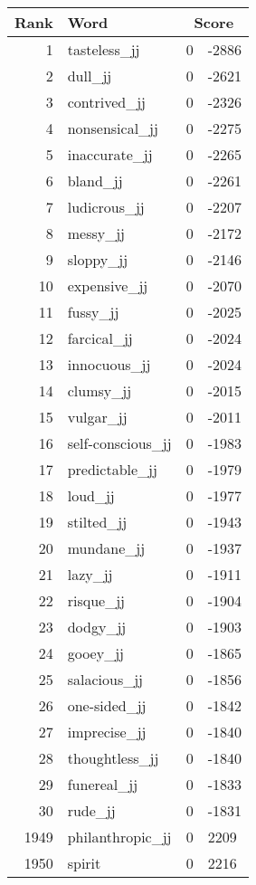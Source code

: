 \begin{longtable}[!htbp]{| rlr@{.}l |}
    \hline
    \textbf{Rank} & \textbf{Word} & \multicolumn{2}{c|}{\textbf{Score}} \\
    \hline
    \endhead
    1 & tasteless\_jj & 0 & -2886 \\
    2 & dull\_jj & 0 & -2621 \\
    3 & contrived\_jj & 0 & -2326 \\
    4 & nonsensical\_jj & 0 & -2275 \\
    5 & inaccurate\_jj & 0 & -2265 \\
    6 & bland\_jj & 0 & -2261 \\
    7 & ludicrous\_jj & 0 & -2207 \\
    8 & messy\_jj & 0 & -2172 \\
    9 & sloppy\_jj & 0 & -2146 \\
    10 & expensive\_jj & 0 & -2070 \\
    11 & fussy\_jj & 0 & -2025 \\
    12 & farcical\_jj & 0 & -2024 \\
    13 & innocuous\_jj & 0 & -2024 \\
    14 & clumsy\_jj & 0 & -2015 \\
    15 & vulgar\_jj & 0 & -2011 \\
    16 & self-conscious\_jj & 0 & -1983 \\
    17 & predictable\_jj & 0 & -1979 \\
    18 & loud\_jj & 0 & -1977 \\
    19 & stilted\_jj & 0 & -1943 \\
    20 & mundane\_jj & 0 & -1937 \\
    21 & lazy\_jj & 0 & -1911 \\
    22 & risque\_jj & 0 & -1904 \\
    23 & dodgy\_jj & 0 & -1903 \\
    24 & gooey\_jj & 0 & -1865 \\
    25 & salacious\_jj & 0 & -1856 \\
    26 & one-sided\_jj & 0 & -1842 \\
    27 & imprecise\_jj & 0 & -1840 \\
    28 & thoughtless\_jj & 0 & -1840 \\
    29 & funereal\_jj & 0 & -1833 \\
    30 & rude\_jj & 0 & -1831 \\
    1949 & philanthropic\_jj & 0 & 2209 \\
    1950 & spirit & 0 & 2216 \\

\end{longtable}
